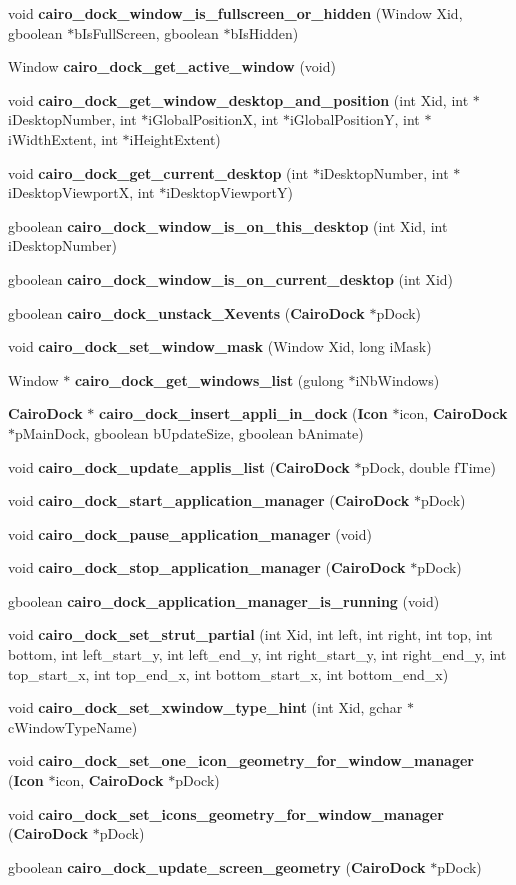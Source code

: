 \begin{CompactItemize}
void {\bf cairo\_\-dock\_\-window\_\-is\_\-fullscreen\_\-or\_\-hidden} (Window Xid, gboolean $\ast$bIsFullScreen, gboolean $\ast$bIsHidden)
\item 
Window {\bf cairo\_\-dock\_\-get\_\-active\_\-window} (void)
\item 
void {\bf cairo\_\-dock\_\-get\_\-window\_\-desktop\_\-and\_\-position} (int Xid, int $\ast$iDesktopNumber, int $\ast$iGlobalPositionX, int $\ast$iGlobalPositionY, int $\ast$iWidthExtent, int $\ast$iHeightExtent)
\item 
void {\bf cairo\_\-dock\_\-get\_\-current\_\-desktop} (int $\ast$iDesktopNumber, int $\ast$iDesktopViewportX, int $\ast$iDesktopViewportY)
\item 
gboolean {\bf cairo\_\-dock\_\-window\_\-is\_\-on\_\-this\_\-desktop} (int Xid, int iDesktopNumber)
\item 
gboolean {\bf cairo\_\-dock\_\-window\_\-is\_\-on\_\-current\_\-desktop} (int Xid)
\item 
gboolean {\bf cairo\_\-dock\_\-unstack\_\-Xevents} ({\bf CairoDock} $\ast$pDock)
\item 
void {\bf cairo\_\-dock\_\-set\_\-window\_\-mask} (Window Xid, long iMask)
\item 
Window $\ast$ {\bf cairo\_\-dock\_\-get\_\-windows\_\-list} (gulong $\ast$iNbWindows)
\item 
{\bf CairoDock} $\ast$ {\bf cairo\_\-dock\_\-insert\_\-appli\_\-in\_\-dock} ({\bf Icon} $\ast$icon, {\bf CairoDock} $\ast$pMainDock, gboolean bUpdateSize, gboolean bAnimate)
\item 
void {\bf cairo\_\-dock\_\-update\_\-applis\_\-list} ({\bf CairoDock} $\ast$pDock, double fTime)
\item 
void {\bf cairo\_\-dock\_\-start\_\-application\_\-manager} ({\bf CairoDock} $\ast$pDock)
\item 
void {\bf cairo\_\-dock\_\-pause\_\-application\_\-manager} (void)
\item 
void {\bf cairo\_\-dock\_\-stop\_\-application\_\-manager} ({\bf CairoDock} $\ast$pDock)
\item 
gboolean {\bf cairo\_\-dock\_\-application\_\-manager\_\-is\_\-running} (void)
\item 
void {\bf cairo\_\-dock\_\-set\_\-strut\_\-partial} (int Xid, int left, int right, int top, int bottom, int left\_\-start\_\-y, int left\_\-end\_\-y, int right\_\-start\_\-y, int right\_\-end\_\-y, int top\_\-start\_\-x, int top\_\-end\_\-x, int bottom\_\-start\_\-x, int bottom\_\-end\_\-x)
\item 
void {\bf cairo\_\-dock\_\-set\_\-xwindow\_\-type\_\-hint} (int Xid, gchar $\ast$cWindowTypeName)
\item 
void {\bf cairo\_\-dock\_\-set\_\-one\_\-icon\_\-geometry\_\-for\_\-window\_\-manager} ({\bf Icon} $\ast$icon, {\bf CairoDock} $\ast$pDock)
\item 
void {\bf cairo\_\-dock\_\-set\_\-icons\_\-geometry\_\-for\_\-window\_\-manager} ({\bf CairoDock} $\ast$pDock)
\item 
gboolean {\bf cairo\_\-dock\_\-update\_\-screen\_\-geometry} ({\bf CairoDock} $\ast$pDock)
\end{CompactItemize}


